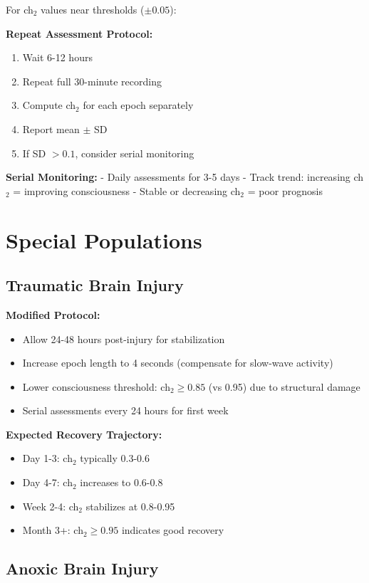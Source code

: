 For ch$_2$ values near thresholds ($\pm 0.05$):

\textbf{Repeat Assessment Protocol:}
\begin{enumerate}
\item Wait 6-12 hours
\item Repeat full 30-minute recording
\item Compute ch$_2$ for each epoch separately
\item Report mean $\pm$ SD
\item If SD $> 0.1$, consider serial monitoring
\end{enumerate}

\textbf{Serial Monitoring:}
- Daily assessments for 3-5 days
- Track trend: increasing ch$_2$ = improving consciousness
- Stable or decreasing ch$_2$ = poor prognosis

\section{Special Populations}

\subsection{Traumatic Brain Injury}

\textbf{Modified Protocol:}
\begin{itemize}
\item Allow 24-48 hours post-injury for stabilization
\item Increase epoch length to 4 seconds (compensate for slow-wave activity)
\item Lower consciousness threshold: ch$_2 \geq 0.85$ (vs 0.95) due to structural damage
\item Serial assessments every 24 hours for first week
\end{itemize}

\textbf{Expected Recovery Trajectory:}
\begin{itemize}
\item Day 1-3: ch$_2$ typically 0.3-0.6
\item Day 4-7: ch$_2$ increases to 0.6-0.8
\item Week 2-4: ch$_2$ stabilizes at 0.8-0.95
\item Month 3+: ch$_2 \geq 0.95$ indicates good recovery
\end{itemize}

\subsection{Anoxic Brain Injury}
\label{sec:appC-anoxic}


